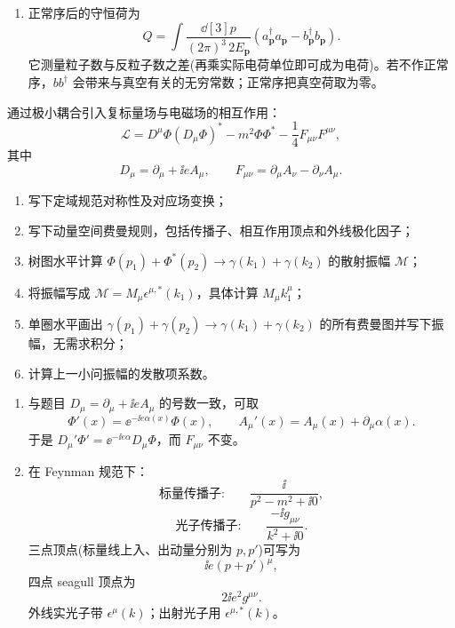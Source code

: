 \begin{question}[25 分]
\begin{solution}
\begin{enumerate}
  \item 正常序后的守恒荷为
  \[
  \boxed{
  Q=\int\frac{\dd[3]{p}}{(2\pi)^3\,2E_{\mathbf p}}
  \left(a_{\mathbf p}^\dagger a_{\mathbf p}
  -b_{\mathbf p}^\dagger b_{\mathbf p}\right)}.
  \]
  它测量粒子数与反粒子数之差(再乘实际电荷单位即可成为电荷)。若不作正常序，$b b^\dagger$ 会带来与真空有关的无穷常数；正常序把真空荷取为零。
\end{enumerate}
\end{solution}
\end{question}

\begin{question}[30 分]
通过极小耦合引入复标量场与电磁场的相互作用：
\[
\mathcal L=D^\mu\Phi(D_\mu\Phi)^*-m^2\Phi\Phi^*-\frac14F_{\mu\nu}F^{\mu\nu},
\]
其中
\[
D_\mu=\partial_\mu+\ii eA_\mu,
\qquad
F_{\mu\nu}=\partial_\mu A_\nu-\partial_\nu A_\mu.
\]
\begin{enumerate}
  \item 写下定域规范对称性及对应场变换；
  \item 写下动量空间费曼规则，包括传播子、相互作用顶点和外线极化因子；
  \item 树图水平计算 $\Phi(p_1)+\Phi^*(p_2)\to\gamma(k_1)+\gamma(k_2)$ 的散射振幅 $\mathcal M$；
  \item 将振幅写成 $\mathcal M=M_\mu\epsilon^{\mu,*}(k_1)$，具体计算 $M_\mu k_1^\mu$；
  \item 单圈水平画出 $\gamma(p_1)+\gamma(p_2)\to\gamma(k_1)+\gamma(k_2)$ 的所有费曼图并写下振幅，无需求积分；
  \item 计算上一小问振幅的发散项系数。
\end{enumerate}
\begin{solution}
\begin{enumerate}
  \item 与题目 $D_\mu=\partial_\mu+\ii eA_\mu$ 的号数一致，可取
  \[
  \boxed{\Phi'(x)=\ee^{-\ii e\alpha(x)}\Phi(x)},\qquad
  \boxed{A_\mu'(x)=A_\mu(x)+\partial_\mu\alpha(x)}.
  \]
  于是 $D_\mu'\Phi'=\ee^{-\ii e\alpha}D_\mu\Phi$，而 $F_{\mu\nu}$ 不变。

  \item 在 Feynman 规范下：
  \[
  \text{标量传播子:}\qquad \frac{\ii}{p^2-m^2+\ii0},
  \]
  \[
  \text{光子传播子:}\qquad \frac{-\ii g_{\mu\nu}}{k^2+\ii0}.
  \]
  三点顶点(标量线上入、出动量分别为 $p,p'$)可写为
  \[
  \boxed{\ii e(p+p')^\mu},
  \]
  四点 seagull 顶点为
  \[
  \boxed{2\ii e^2g^{\mu\nu}}.
  \]
  外线实光子带 $\epsilon^\mu(k)$；出射光子用 $\epsilon^{\mu,*}(k)$。


\end{enumerate}
\end{solution}
\end{question}
